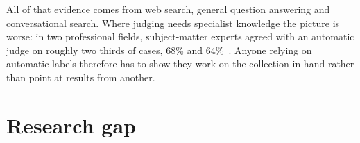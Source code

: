 All of that evidence comes from web search, general question answering and conversational
search. Where judging needs specialist knowledge the picture is worse: in two
professional fields, subject-matter experts agreed with an automatic judge on roughly two
thirds of cases, 68\% and 64\%~\cite{szymanski2025judgelimits}. Anyone relying on automatic labels
therefore has to show they work on the collection in hand rather than point at results
from another.


\section{Research gap}\label{sec:rw-gap}

%
%
%
